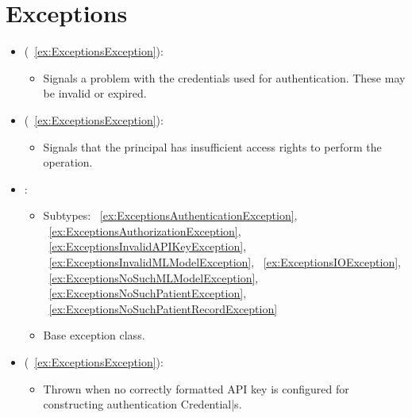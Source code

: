 \section{Exceptions}\label{sec:exceptions}
\begin{itemize}[nolistsep,noitemsep]
\item {} (\iconinher{}~\ref{ex:ExceptionsException}): 
\begin{itemize}[noitemsep,nolistsep]

\item[] Signals a problem with the credentials used for authentication. These may be invalid or expired.
\end{itemize}

\item {} (\iconinher{}~\ref{ex:ExceptionsException}): 
\begin{itemize}[noitemsep,nolistsep]

\item[] Signals that the principal has insufficient access rights to perform the operation.
\end{itemize}

\item {}: 
\begin{itemize}[noitemsep,nolistsep]
\item[] Subtypes: \iconinher{}~\ref{ex:ExceptionsAuthenticationException}, \iconinher{}~\ref{ex:ExceptionsAuthorizationException}, \iconinher{}~\ref{ex:ExceptionsInvalidAPIKeyException}, \iconinher{}~\ref{ex:ExceptionsInvalidMLModelException}, \iconinher{}~\ref{ex:ExceptionsIOException}, \iconinher{}~\ref{ex:ExceptionsNoSuchMLModelException}, \iconinher{}~\ref{ex:ExceptionsNoSuchPatientException}, \iconinher{}~\ref{ex:ExceptionsNoSuchPatientRecordException}
\item[] Base exception class.
\end{itemize}

\item {} (\iconinher{}~\ref{ex:ExceptionsException}): 
\begin{itemize}[noitemsep,nolistsep]

\item[] Thrown when no correctly formatted API key is configured for constructing authentication Credential|s.
\end{itemize}


\end{itemize}
